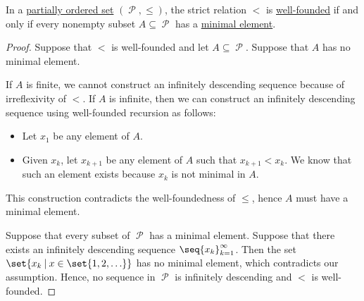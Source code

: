 \begin{proposition}\label{thm:infinite_descent_partial_order}
  In a \hyperref[def:partially_ordered_set]{partially ordered set} \( (\mscrP, \leq) \), the strict relation \( < \) is \hyperref[def:well_founded_relation]{well-founded} if and only if every nonempty subset \( A \subseteq \mscrP \) has a \hyperref[def:partially_ordered_set_extremal_points/maximal_and_minimal_element]{minimal element}.
\end{proposition}
\begin{proof}
  \SufficiencySubProof Suppose that \( < \) is well-founded and let \( A \subseteq \mscrP \). Suppose that \( A \) has no minimal element.

  If \( A \) is finite, we cannot construct an infinitely descending sequence because of irreflexivity of \( < \). If \( A \) is infinite, then we can construct an infinitely descending sequence using well-founded recursion as follows:
  \begin{itemize}
    \item Let \( x_1 \) be any element of \( A \).
    \item Given \( x_k \), let \( x_{k+1} \) be any element of \( A \) such that \( x_{k+1} < x_k \). We know that such an element exists because \( x_k \) is not minimal in \( A \).
  \end{itemize}

  This construction contradicts the well-foundedness of  \( \leq \), hence \( A \) must have a minimal element.

  \NecessitySubProof Suppose that every subset of \( \mscrP \) has a minimal element. Suppose that there exists an infinitely descending sequence \( \seq{ x_k }_{k=1}^\infty \). Then the set \( \set{ x_k \given x \in \set{ 1, 2, \ldots } } \) has no minimal element, which contradicts our assumption. Hence, no sequence in \( \mscrP \) is infinitely descending and \( < \) is well-founded.
\end{proof}

